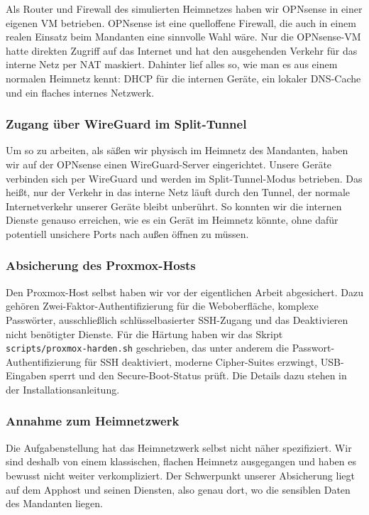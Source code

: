 Als Router und Firewall des simulierten Heimnetzes haben wir OPNsense in einer
eigenen \ac{VM} betrieben. OPNsense ist eine quelloffene Firewall, die
auch in einem realen Einsatz beim Mandanten eine sinnvolle Wahl wäre. Nur die
OPNsense-\ac{VM} hatte direkten Zugriff auf das Internet und hat den ausgehenden
Verkehr für das interne Netz per \ac{NAT} maskiert. Dahinter lief alles so, wie man
es aus einem normalen Heimnetz kennt: \ac{DHCP} für die internen Geräte, ein
lokaler \ac{DNS}-Cache und ein flaches internes Netzwerk.

\subsubsection*{Zugang über WireGuard im Split-Tunnel}

Um so zu arbeiten, als säßen wir physisch im Heimnetz des Mandanten,
haben wir auf der OPNsense einen WireGuard-Server eingerichtet. Unsere Geräte
verbinden sich per WireGuard und werden im Split-Tunnel-Modus betrieben. Das
heißt, nur der Verkehr in das interne Netz läuft durch den Tunnel, der
normale Internetverkehr unserer Geräte bleibt unberührt. So konnten wir die
internen Dienste genauso erreichen, wie es ein Gerät im Heimnetz könnte, ohne
dafür potentiell unsichere Ports nach außen öffnen zu müssen.

\subsubsection*{Absicherung des Proxmox-Hosts} \label{sec:SSH}

Den Proxmox-Host selbst haben wir vor der eigentlichen Arbeit abgesichert. Dazu
gehören Zwei-Faktor-Authentifizierung für die Weboberfläche, komplexe
Passwörter, ausschließlich schlüsselbasierter \ac{SSH}-Zugang und das Deaktivieren
nicht benötigter Dienste. Für die Härtung haben wir das Skript
\texttt{scripts/proxmox-harden.sh} geschrieben, das unter anderem die
Passwort-Authentifizierung für \ac{SSH} deaktiviert, moderne Cipher-Suites erzwingt,
\ac{USB}-Eingaben sperrt und den Secure-Boot-Status prüft. Die Details dazu stehen
in der Installationsanleitung.

\subsubsection*{Annahme zum Heimnetzwerk}

Die Aufgabenstellung hat das Heimnetzwerk selbst nicht näher spezifiziert. Wir
sind deshalb von einem klassischen, flachen Heimnetz ausgegangen und haben es
bewusst nicht weiter verkompliziert. Der Schwerpunkt unserer Absicherung liegt
auf dem Apphost und seinen Diensten, also genau dort, wo die sensiblen Daten
des Mandanten liegen.

